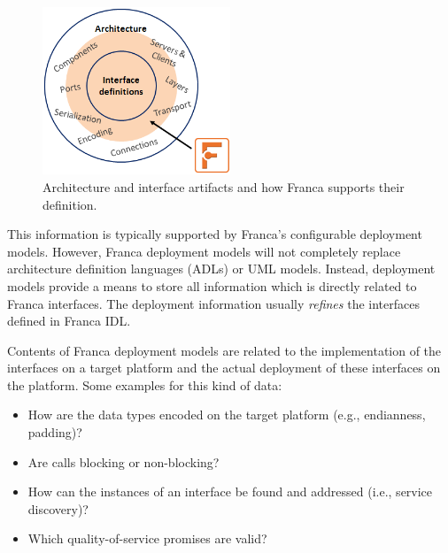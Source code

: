\documentclass[a4paper,10pt]{scrreprt}
\newlength{\XdocItemIndent}
\begin{document}
\begin{figure}[!ht]
\centering
\includegraphics[width=0.50\textwidth]{images/franca_idl_and_deploy_overview.png}
\caption{Architecture and interface artifacts and how Franca supports their definition.}
\label{DeploymentSupport}
\end{figure}

This information is typically supported by Franca's configurable deployment models.
However, Franca deployment models will not completely replace architecture definition
languages (ADLs) or UML models. Instead, deployment models provide a means to store
all information which is directly related to Franca interfaces. The deployment information
usually \textit{refines} the interfaces defined in Franca IDL.

Contents of Franca deployment models are related to the implementation
of the interfaces on a target platform and the actual deployment of these
interfaces on the platform. Some examples for this kind of data:
\setlength{\XdocItemIndent}{\textwidth}
\begin{itemize}
\addtolength{\XdocItemIndent}{-2.5em}
\item \begin{minipage}[t]{\XdocItemIndent}
How are the data types encoded on the target platform (e.g., endianness, padding)?

\end{minipage}
\item \begin{minipage}[t]{\XdocItemIndent}
Are calls blocking or non-blocking?

\end{minipage}
\item \begin{minipage}[t]{\XdocItemIndent}
How can the instances of an interface be found and addressed (i.e., service discovery)?

\end{minipage}
\item \begin{minipage}[t]{\XdocItemIndent}
Which quality-of-service promises are valid?

\end{minipage}
\end{itemize}
\addtolength{\XdocItemIndent}{2.5em}
\end{document}
